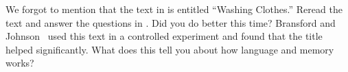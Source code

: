 






\begin{exercise}
We forgot to mention that the text in
 is entitled ``Washing Clothes.''  Reread
the text and answer the questions in .  Did
you do better this time?  Bransford and
Johnson~\citeyear{Bransford+Johnson:1973} used this text in a 
controlled experiment and found that the title helped significantly.
What does this tell you about how language and memory works?
\end{exercise} 


\resetmedskipamount
